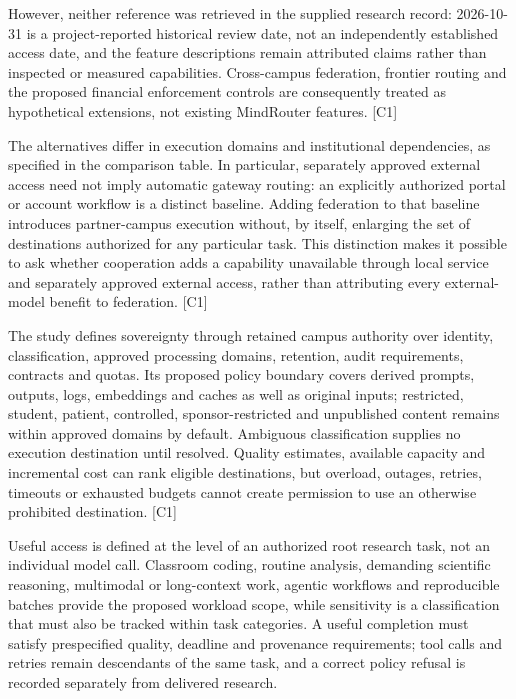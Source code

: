 \documentclass[11pt]{article}
\begin{document}
However, neither reference was retrieved in the supplied research record: 2026-10-31 is a project-reported historical review date, not an independently established access date, and the feature descriptions remain attributed claims rather than inspected or measured capabilities. Cross-campus federation, frontier routing and the proposed financial enforcement controls are consequently treated as hypothetical extensions, not existing MindRouter features. [C1]

The alternatives differ in execution domains and institutional dependencies, as specified in the comparison table. In particular, separately approved external access need not imply automatic gateway routing: an explicitly authorized portal or account workflow is a distinct baseline. Adding federation to that baseline introduces partner-campus execution without, by itself, enlarging the set of destinations authorized for any particular task. This distinction makes it possible to ask whether cooperation adds a capability unavailable through local service and separately approved external access, rather than attributing every external-model benefit to federation. [C1]

The study defines sovereignty through retained campus authority over identity, classification, approved processing domains, retention, audit requirements, contracts and quotas. Its proposed policy boundary covers derived prompts, outputs, logs, embeddings and caches as well as original inputs; restricted, student, patient, controlled, sponsor-restricted and unpublished content remains within approved domains by default. Ambiguous classification supplies no execution destination until resolved. Quality estimates, available capacity and incremental cost can rank eligible destinations, but overload, outages, retries, timeouts or exhausted budgets cannot create permission to use an otherwise prohibited destination. [C1]

Useful access is defined at the level of an authorized root research task, not an individual model call. Classroom coding, routine analysis, demanding scientific reasoning, multimodal or long-context work, agentic workflows and reproducible batches provide the proposed workload scope, while sensitivity is a classification that must also be tracked within task categories. A useful completion must satisfy prespecified quality, deadline and provenance requirements; tool calls and retries remain descendants of the same task, and a correct policy refusal is recorded separately from delivered research.
\end{document}
